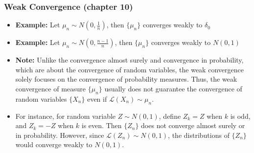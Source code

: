 \documentclass[handout]{beamer}
\begin{document}
\frame
{
\frametitle{Weak Convergence (chapter 10) } 

\begin{itemize}

\item<1-> \textbf{Example:} Let $\mu_n\sim N(0, \frac{1}{n})$, then  $\{\mu_n \}$ converges weakly to $\delta_0$

\item<1-> \textbf{Example:} Let $\mu_n\sim N(0, \frac{n-1}{n})$, then  $\{\mu_n \}$ converges weakly to $N(0, 1)$

\item<2-> \textbf{Note:} Unlike the convergence almost surely and convergence in probability, which are about the convergence of random variables, the weak convergence solely focuses on the convergence of probability measures. Thus, the weak convergence of measure $\{\mu_n \}$ usually does not guarantee the convergence of random variables $\{X_n\}$ even if $\mathcal{L} (X_n)\sim \mu_n$. 
                 
\item<3-> For instance, for random variable $Z\sim N(0,1)$, define $Z_k=Z$ when $k$ is odd, and $Z_k=-Z$ when $k$ is even. Then $\{Z_n\}$ does not converge almost surely or in probability. However, since $\mathcal{L} (Z_n) \sim N(0,1)$,  the distributions of $\{Z_n\}$ would converge weakly to $N(0,1)$.
                   
\end{itemize}
}
\end{document}
